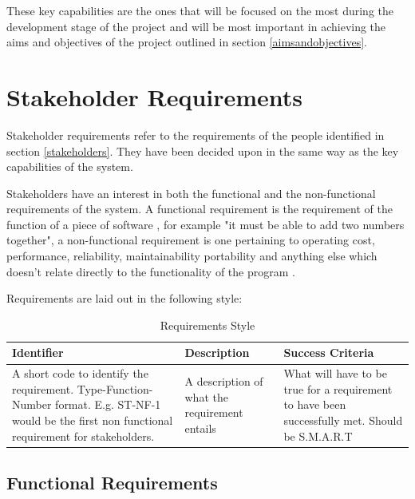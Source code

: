\documentclass[11pt]{book}
\begin{document}
These key capabilities are the ones that will be focused on the most during the development stage of the project and will be most important in achieving the aims and objectives of the project outlined in section \ref{aimsandobjectives}.

\section{Stakeholder Requirements}
Stakeholder requirements refer to the requirements of the people identified in section \ref{stakeholders}. They have been decided upon in the same way as the key capabilities of the system. 

Stakeholders have an interest in both the functional and the non-functional requirements of the system. A functional requirement is the requirement of the function of a piece of software \cite{functionalrequirements}, for example "it must be able to add two numbers together", a non-functional requirement is one pertaining to operating cost, performance, reliability, maintainability portability and anything else which doesn't relate directly to the functionality of the program \cite{nonfunctionalrequirements}.

Requirements are laid out in the following style:

\begin{table}[h]
\centering
\begin{tabular}{|p{5cm}|p{5cm}|p{5cm}|}
\hline
\textbf{Identifier} & \textbf{Description} & \textbf{Success Criteria} \\ \hline
A short code to identify the requirement. Type-Function-Number format. E.g. ST-NF-1 would be the first non functional requirement for stakeholders. & A description of what the requirement entails  & What will have to be true for a requirement to have been successfully met. Should be S.M.A.R.T \cite{SMART} \\ \hline
\end{tabular}
\caption{Requirements Style}
\label{tab:requirementsstyle}
\end{table}

\clearpage
\subsection{Functional Requirements}
\end{document}
